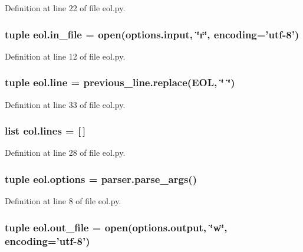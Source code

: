 Definition at line 22 of file eol.\+py.

\hypertarget{namespaceeol_af8d4f31a15a99500f2927c5c7c6f0206}{
\subsubsection[{in\+\_\+file}]{\setlength{\rightskip}{0pt plus 5cm}tuple eol.\+in\+\_\+file = open(options.\+input, \char`\"{}r\char`\"{}, encoding='utf-\/8')}}\label{namespaceeol_af8d4f31a15a99500f2927c5c7c6f0206}


Definition at line 12 of file eol.\+py.

\hypertarget{namespaceeol_a12767f8ab35a2de0036b1fdd5af23567}{
\subsubsection[{line}]{\setlength{\rightskip}{0pt plus 5cm}tuple eol.\+line = previous\+\_\+line.\+replace({\bf E\+O\+L}, \char`\"{} \char`\"{})}}\label{namespaceeol_a12767f8ab35a2de0036b1fdd5af23567}


Definition at line 33 of file eol.\+py.

\hypertarget{namespaceeol_abeaa70f48fe541fa9a735489ca6e95ff}{
\subsubsection[{lines}]{\setlength{\rightskip}{0pt plus 5cm}list eol.\+lines = \mbox{[}$\,$\mbox{]}}}\label{namespaceeol_abeaa70f48fe541fa9a735489ca6e95ff}


Definition at line 28 of file eol.\+py.

\hypertarget{namespaceeol_aa15858a183d9b65efbca9cf401bd0227}{
\subsubsection[{options}]{\setlength{\rightskip}{0pt plus 5cm}tuple eol.\+options = parser.\+parse\+\_\+args()}}\label{namespaceeol_aa15858a183d9b65efbca9cf401bd0227}


Definition at line 8 of file eol.\+py.

\hypertarget{namespaceeol_a44bd6aa643636fce9c0f8aa2214eb4af}{
\subsubsection[{out\+\_\+file}]{\setlength{\rightskip}{0pt plus 5cm}tuple eol.\+out\+\_\+file = open(options.\+output, \char`\"{}w\char`\"{}, encoding='utf-\/8')}}\label{namespaceeol_a44bd6aa643636fce9c0f8aa2214eb4af}


